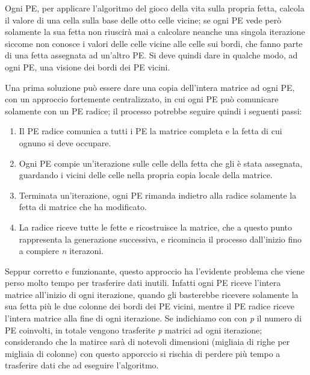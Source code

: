 Ogni PE, per applicare l'algoritmo del gioco della vita sulla propria fetta, calcola il valore di una cella sulla base delle otto celle vicine; se ogni PE vede per\`o solamente la sua fetta non riuscir\`a mai a calcolare neanche una singola iterazione siccome non conosce i valori delle celle vicine alle celle sui bordi, che fanno parte di una fetta assegnata ad un'altro PE. Si deve quindi dare in qualche modo, ad ogni PE, una visione dei bordi dei PE vicini.

Una prima soluzione pu\`o essere dare una copia dell'intera matrice ad ogni PE, con un approccio fortemente centralizzato, in cui ogni PE pu\`o comunicare solamente con un PE radice; il processo potrebbe seguire quindi i seguenti passi:
\begin{enumerate}
  \item Il PE radice comunica a tutti i PE la matrice completa e la fetta di cui ognuno si deve occupare.
  \item Ogni PE compie un'iterazione sulle celle della fetta che gli \`e stata assegnata, guardando i vicini delle celle nella propria copia locale della matrice.
  \item Terminata un'iterazione, ogni PE rimanda indietro alla radice solamente la fetta di matrice che ha modificato.
  \item La radice riceve tutte le fette e ricostruisce la matrice, che a questo punto rappresenta la generazione successiva, e ricomincia il processo dall'inizio fino a compiere \textit{n} iterazoni.
\end{enumerate}
Seppur corretto e funzionante, questo approccio ha l'evidente problema che viene perso molto tempo per trasferire dati inutili. Infatti ogni PE riceve l'intera matrice all'inizio di ogni iterazione, quando gli basterebbe ricevere solamente la sua fetta pi\`u le due colonne dei bordi dei PE vicini, mentre il PE radice riceve l'intera matrice alla fine di ogni iterazione. Se indichiamo con con \textit{p} il numero di PE coinvolti, in totale vengono trasferite \textit{p} matrici ad ogni iterazione; considerando che la matirce sar\`a di notevoli dimensioni (migliaia di righe per migliaia di colonne) con questo apporccio si rischia di perdere pi\`u tempo a trasferire dati che ad eseguire l'algoritmo.

